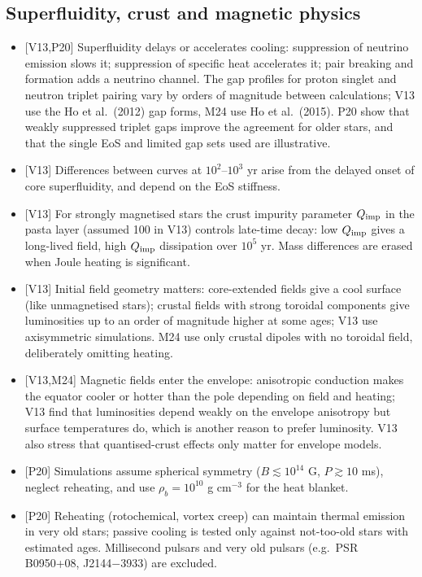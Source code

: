 \documentclass[11pt,a4paper]{article}
\newcommand{\src}[1]{\textsf{[#1]}}
\begin{document}
\subsection{Superfluidity, crust and magnetic physics}
\begin{itemize}[leftmargin=1.2em,itemsep=0pt]
\item \src{V13,P20} Superfluidity delays or accelerates cooling: suppression of neutrino emission slows it; suppression of specific heat accelerates it; pair breaking and formation adds a neutrino channel. The gap profiles for proton singlet and neutron triplet pairing vary by orders of magnitude between calculations; V13 use the Ho et al.\ (2012) gap forms, M24 use Ho et al.\ (2015). P20 show that weakly suppressed triplet gaps improve the agreement for older stars, and that the single EoS and limited gap sets used are illustrative.
\item \src{V13} Differences between curves at $10^2$--$10^3$ yr arise from the delayed onset of core superfluidity, and depend on the EoS stiffness.
\item \src{V13} For strongly magnetised stars the crust impurity parameter $Q_{\rm imp}$ in the pasta layer (assumed 100 in V13) controls late-time decay: low $Q_{\rm imp}$ gives a long-lived field, high $Q_{\rm imp}$ dissipation over $10^5$ yr. Mass differences are erased when Joule heating is significant.
\item \src{V13} Initial field geometry matters: core-extended fields give a cool surface (like unmagnetised stars); crustal fields with strong toroidal components give luminosities up to an order of magnitude higher at some ages; V13 use axisymmetric simulations. M24 use only crustal dipoles with no toroidal field, deliberately omitting heating.
\item \src{V13,M24} Magnetic fields enter the envelope: anisotropic conduction makes the equator cooler or hotter than the pole depending on field and heating; V13 find that luminosities depend weakly on the envelope anisotropy but surface temperatures do, which is another reason to prefer luminosity. V13 also stress that quantised-crust effects only matter for envelope models.
\item \src{P20} Simulations assume spherical symmetry ($B\lesssim10^{14}$ G, $P\gtrsim10$ ms), neglect reheating, and use $\rho_b=10^{10}$ g cm$^{-3}$ for the heat blanket.
\item \src{P20} Reheating (rotochemical, vortex creep) can maintain thermal emission in very old stars; passive cooling is tested only against not-too-old stars with estimated ages. Millisecond pulsars and very old pulsars (e.g.\ PSR B0950+08, J2144$-$3933) are excluded.

\end{itemize}
\end{document}
